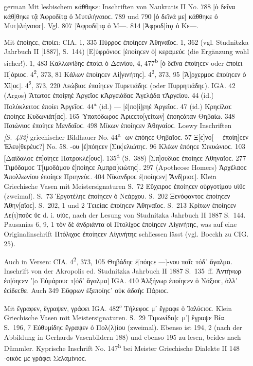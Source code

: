 \begin{otherlanguage*}{german}
Mit lesbischem κάθθηκε: Inschriften von Naukratis II No. 788 [ὁ δεῖνα κάθ]θη\-κε τᾷ Ἀφροδίτᾳ ὀ Μυτιλήναιοϲ. 789 und 790 [ὁ δεῖνά με] κάθθηκε ὀ Μυ\-τ[ι\-λή\-ναι\-οϲ]. Vgl. 807 [Ἀφροδί]τᾳ ὁ Μ—. 814 [Ἀφροδ]ίτᾳ ὁ Κε—.

Mit ἐποίηϲε, ἐποίει: CΙΑ. 1, 335 Πύρροϲ ἐποίηϲεν Ἀθηναῖοϲ. 1, 362 (vgl. Studnitzka Jahrbuch II [1887], S.~144) [Ε]ὐφρόνιοϲ [ἐποίηϲεν ὁ] κεραμεύϲ (die Ergänzung wohl sicher!). 1, 483 Καλλωνίδηϲ ἐποίει ὁ Δεινίου, 4, 477\textsuperscript{b} [ὁ δεῖνα ἐποίηϲεν oder ἐποίει Π]άριοϲ. 4\textsuperscript{2}, 373, 81 Κάλων ἐποίηϲεν Αἱ[γινήτηϲ]. 4\textsuperscript{2}, 373, 95 [Ἄ]ρχερμοϲ ἐποίηϲεν ὁ Χῖ[οϲ]. 4\textsuperscript{2}, 373, 220 Λεώβιοϲ ἐποίηϲεν Πυρετιάδηϲ (oder Πυρρητιάδηϲ). IGA. 42 (Argos) Ἄτωτοϲ ἐποίϝηἑ Ἀργεῖοϲ κἈργειάδαϲ Ἁγελᾴδα τἈργείου. 44 (id.) Πολύκλειτοϲ ἐποίει Ἀργεῖοϲ. 44\textsuperscript{a} (id.) — [ἐ]πο[ί]ϝηἑ Ἀργεῖοϲ. 47 (id.) Κρηϲίλαϲ ἐποίηϲε Κυδωνιάτ[αϲ]. 165 Ὑπατόδωροϲ Ἀριϲϲτο[γείτων] ἐποηϲάταν Θηβαίω. 348 Παιώνιοϲ ἐποίηϲε Μενδαῖοϲ. 498 Μίκων ἐποίηϲεν Ἀθη\-ναί\-οϲ. Loewy Inschriften \hypertarget{p432}{\emph{[S.~432]}}\label{p432} griechischer Bildhauer No. 44\textsuperscript{a} -ων ἐπόηϲε Θηβαῖοϲ. 57 Ξ[ε]νο[— ἐποίη]ϲεν Ἐλευ[θερέυϲ?] No. 58. -ου [ἐ]πόηϲεν [Σικ]ε\-λι\-ώ\-τηϲ. 96 Κλέων ἐπόηϲε Σικυώνιοϲ. 103 [Δαίδαλοϲ ἐπ]οίηϲε Πατροκλέ[ουϲ]. 135\textsuperscript{d} (S.~388) [Σπ]ουδίαϲ ἐποίηϲε Ἀθηναῖοϲ. 277 Τιμόδαμοϲ Τ[ιμοδάμου ἐ]ποίηϲε Ἀμπρα[κιώτηϲ]. 297 (Apotheose Homers) Ἀρχέλαοϲ Ἀπολλωνίου ἐποίηϲε Πρι\-η\-νεύϲ. 404 Νίκανδροϲ ἐ[ποίηϲεν] Ἄνδ[ριοϲ]. Klein Griechische Vasen mit Meistersignaturen S.~72 Εὔχειροϲ ἐποίηϲεν οὑργοτίμου υἱὕϲ (zweimal). S.~73 Ἐργοτέληϲ ἐποίηϲεν ὁ Νεάρχου. S.~202 Ξενόφαντοϲ ἐποίηϲεν Ἀθην[αῖοϲ]. S.~202, 1 und 2 Τειϲίαϲ ἐποίηϲεν Ἁθηναῖοϲ. S.~213 Κρίτων ἐποίηϲεν Λε(ι)ποῦϲ ὕϲ d. i. υἱύϲ, nach der Lesung von Studnitzka Jahrbuch II 1887 S.~144. Pausanias 6, 9, 1 τὸν δὲ ἀνδριάντα οἱ Πτολίχοϲ ἐποίηϲεν Αἰγινήτηϲ, was auf eine Originalinschrift Πτόλιχοϲ ἐποίηϲεν Αἰγινήτηϲ schliessen lässt (vgl. Boeckh zu CIG. 25).

Auch in Versen: CIA. 4\textsuperscript{2}, 373, 105 Θηβάδηϲ ἐ[πόηϲε —]-νου παῖϲ τόδ᾽ ἄγαλμα. Inschrift von der Akropolis ed. Studnitzka Jahrbuch II 1887 S.~135~ff. Ἀντήνωρ ἐπ[όηϲεν ῾]o Εὐμάρουϲ τ[όδ᾽ ἄγαλμα] IGA. 410 Ἀλξήνωρ ἐποίηϲεν ὁ Νάξιοϲ, ἀλλ᾽ ἐϲίδεϲθε. Auch 349 Εὔφρων ἐξεποίηϲ᾽ οὐκ ἀδαὴϲ Πάριοϲ.

Mit ἔγραφεν, ἔγραψεν, γράφει IGA. 482\textsuperscript{c} Τήλεφοϲ μ᾽ ἔγραφε ὁ Ἰαλύϲιοϲ. Klein Griechische Vasen mit Meistersignaturen. S.~29 Τιμωνίδα[ϲ μ᾽] ἔγραψε Βία. S.~196, 7 Εὐθυμίδηϲ ἔγραψεν ὁ Πολ(λ)ίου (zweimal). Ebenso ist 194, 2 (nach der Abbildung in Gerhards Vasenbildern 188) und ebenso 195 zu lesen, beides nach Dümmler. Kyprische Inschrift No. 147\textsuperscript{h} bei Meister Griechische Dialekte II 148 -οικόϲ με γράφει Σελαμίνιοϲ.


\end{otherlanguage*}
